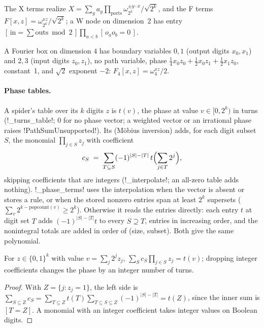 The X terms realize $X=\sum_y a_y\prod_{\text{ports}}\omega_{2^k}^{\pm y\cdot x}/\sqrt{2^k}$, and the F terms $F[x,z]=\omega_{2^k}^{xz}/\sqrt{2^k}$; a W node on dimension~2 has entry $[\,\text{in}=\sum\text{outs} \bmod 2\,]\prod_{a<b}[\,o_ao_b=0\,]$.

\begin{example}
A Fourier box on dimension $4$ has boundary variables $0,1$ (output digits $x_0,x_1$) and $2,3$ (input digits $z_0,z_1$), no path variable, phase $\tfrac14x_0z_0+\tfrac12x_0z_1+\tfrac12x_1z_0$, constant~1, and $\sqrt2$ exponent $-2$: $F_4[x,z]=\omega_4^{xz}/2$.
\end{example}

\paragraph{Phase tables.} A spider's table over its $k$ digits $z$ is $t(v)$, the phase at value $v\in[0,2^k)$ in turns (\py!_turns_table!; 0 for no phase vector; a weighted vector or an irrational phase raises \py!PathSumUnsupported!). Its  (Möbius inversion) adds, for each digit subset $S$, the monomial $\prod_{j\in S}z_j$ with coefficient
\[
c_S \;=\; \sum_{T\subseteq S}(-1)^{|S|-|T|}\,t\Bigl(\sum_{j\in T}2^j\Bigr),
\]
skipping coefficients that are integers (\py!_interpolate!; an all-zero table adds nothing). \py!_phase_terms! uses the interpolation when the vector is absent or stores a rule, or when the stored nonzero entries span at least $2^k$ supersets ($\sum_v 2^{k-\mathrm{popcount}(v)}\ge 2^k$). Otherwise it reads the entries directly: each entry $t$ at digit set $T$ adds $(-1)^{|S|-|T|}t$ to every $S\supseteq T$, entries in increasing order, and the nonintegral totals are added in order of (size, subset). Both give the same polynomial.

\begin{proposition}\label{prop:semantics-mobius}
For $z\in\{0,1\}^k$ with value $v=\sum_j 2^jz_j$, $\sum_S c_S\prod_{j\in S}z_j=t(v)$; dropping integer coefficients changes the phase by an integer number of turns.
\end{proposition}
\begin{proof}
With $Z=\{j: z_j=1\}$, the left side is $\sum_{S\subseteq Z}c_S=\sum_{T\subseteq Z}t(T)\sum_{T\subseteq S\subseteq Z}(-1)^{|S|-|T|}=t(Z)$, since the inner sum is $[T=Z]$. A monomial with an integer coefficient takes integer values on Boolean digits.
\end{proof}

